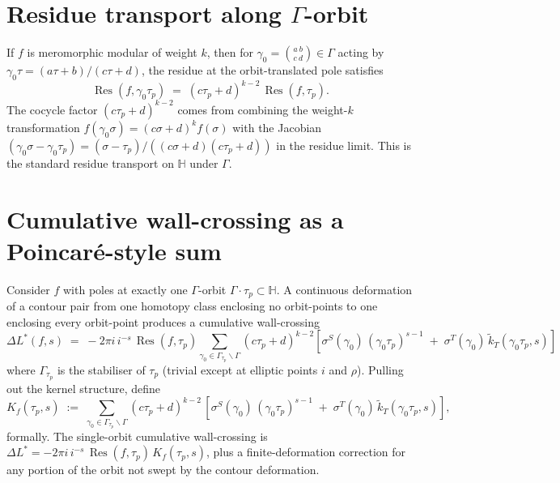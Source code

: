 \documentclass[11pt]{article}
\newcommand{\HH}{\mathbb{H}}
\DeclareMathOperator{\Res}{Res}
\begin{document}
\section{Residue transport along $\Gamma$-orbit}\label{sec:residue-transport}

If $f$ is meromorphic modular of weight $k$, then for $\gamma_0 =
\binom{a\ b}{c\ d} \in \Gamma$ acting by
$\gamma_0\tau = (a\tau + b)/(c\tau + d)$, the residue at the
orbit-translated pole satisfies
\begin{equation}\label{eq:residue-cocycle}
  \Res(f, \gamma_0\tau_p)
  \;=\; (c\tau_p + d)^{k - 2}\,\Res(f, \tau_p).
\end{equation}
The cocycle factor $(c\tau_p + d)^{k-2}$ comes from combining the
weight-$k$ transformation $f(\gamma_0\sigma) = (c\sigma + d)^k
f(\sigma)$ with the Jacobian $(\gamma_0\sigma - \gamma_0\tau_p) =
(\sigma - \tau_p)/((c\sigma + d)(c\tau_p + d))$ in the residue limit.
This is the standard residue transport on $\HH$ under $\Gamma$.

\section{Cumulative wall-crossing as a Poincar\'e-style sum}

Consider $f$ with poles at exactly one $\Gamma$-orbit $\Gamma\cdot
\tau_p \subset \HH$.  A continuous deformation of a contour pair from
one homotopy class enclosing no orbit-points to one enclosing every
orbit-point produces a cumulative wall-crossing
\begin{equation}\label{eq:cumulative}
  \Delta L^*(f, s)
  \;=\; -2\pi i\,i^{-s}\,\Res(f, \tau_p)
  \!\sum_{\gamma_0 \in \Gamma_{\tau_p}\backslash\Gamma}\!
  (c\tau_p + d)^{k - 2}
  \!\left[\sigma^S(\gamma_0)\,(\gamma_0\tau_p)^{s - 1}
  \;+\; \sigma^T(\gamma_0)\,\widetilde{k}_T(\gamma_0\tau_p, s)\right]
\end{equation}
where $\Gamma_{\tau_p}$ is the stabiliser of $\tau_p$ (trivial except
at elliptic points $i$ and $\rho$).  Pulling out the kernel structure,
define
\begin{equation}\label{eq:Kf-def}
  K_f(\tau_p, s)
  \;:=\; \!\sum_{\gamma_0 \in \Gamma_{\tau_p}\backslash\Gamma}\!
  (c\tau_p + d)^{k - 2}\,
  \left[\sigma^S(\gamma_0)\,(\gamma_0\tau_p)^{s - 1}
  \;+\; \sigma^T(\gamma_0)\,\widetilde{k}_T(\gamma_0\tau_p, s)\right],
\end{equation}
formally.  The single-orbit cumulative wall-crossing is
$\Delta L^* = -2\pi i\,i^{-s}\,\Res(f, \tau_p)\,K_f(\tau_p, s)$, plus
a finite-deformation correction for any portion of the orbit not
swept by the contour deformation.
\end{document}
